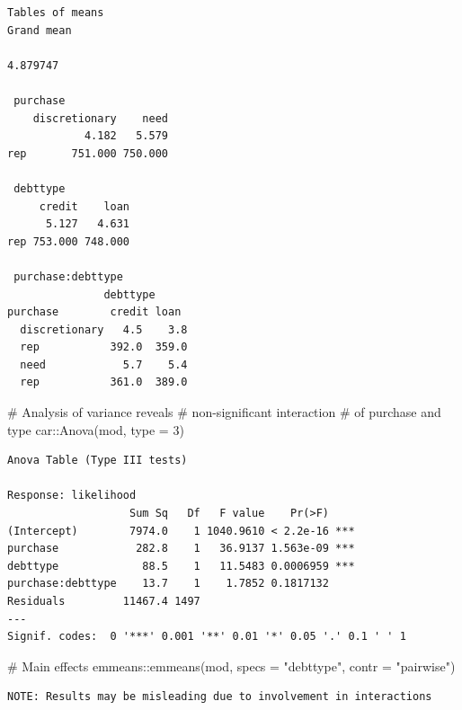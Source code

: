 \documentclass[
  11pt,
  letterpaper,
]{scrbook}
\newenvironment{Shaded}{\begin{snugshade}}{\end{snugshade}}
\newcommand{\AttributeTok}[1]{\textcolor[rgb]{0.40,0.45,0.13}{#1}}
\newcommand{\CommentTok}[1]{\textcolor[rgb]{0.37,0.37,0.37}{#1}}
\newcommand{\DecValTok}[1]{\textcolor[rgb]{0.68,0.00,0.00}{#1}}
\newcommand{\FunctionTok}[1]{\textcolor[rgb]{0.28,0.35,0.67}{#1}}
\newcommand{\NormalTok}[1]{\textcolor[rgb]{0.00,0.23,0.31}{#1}}
\newcommand{\SpecialCharTok}[1]{\textcolor[rgb]{0.37,0.37,0.37}{#1}}
\newcommand{\StringTok}[1]{\textcolor[rgb]{0.13,0.47,0.30}{#1}}
\theoremstyle{definition}
\theoremstyle{remark}
\begin{document}
\begin{verbatim}
Tables of means
Grand mean
         
4.879747 

 purchase 
    discretionary    need
            4.182   5.579
rep       751.000 750.000

 debttype 
     credit    loan
      5.127   4.631
rep 753.000 748.000

 purchase:debttype 
               debttype
purchase        credit loan 
  discretionary   4.5    3.8
  rep           392.0  359.0
  need            5.7    5.4
  rep           361.0  389.0
\end{verbatim}

\begin{Shaded}
\begin{Highlighting}[]
\CommentTok{\# Analysis of variance reveals }
\CommentTok{\# non{-}significant interaction}
\CommentTok{\# of purchase and type}
\NormalTok{car}\SpecialCharTok{::}\FunctionTok{Anova}\NormalTok{(mod, }\AttributeTok{type =} \DecValTok{3}\NormalTok{)}
\end{Highlighting}
\end{Shaded}

\begin{verbatim}
Anova Table (Type III tests)

Response: likelihood
                   Sum Sq   Df   F value    Pr(>F)    
(Intercept)        7974.0    1 1040.9610 < 2.2e-16 ***
purchase            282.8    1   36.9137 1.563e-09 ***
debttype             88.5    1   11.5483 0.0006959 ***
purchase:debttype    13.7    1    1.7852 0.1817132    
Residuals         11467.4 1497                        
---
Signif. codes:  0 '***' 0.001 '**' 0.01 '*' 0.05 '.' 0.1 ' ' 1
\end{verbatim}

\begin{Shaded}
\begin{Highlighting}[]
\CommentTok{\# Main effects}
\NormalTok{emmeans}\SpecialCharTok{::}\FunctionTok{emmeans}\NormalTok{(mod, }
                 \AttributeTok{specs =} \StringTok{"debttype"}\NormalTok{,}
                 \AttributeTok{contr =} \StringTok{"pairwise"}\NormalTok{)}
\end{Highlighting}
\end{Shaded}

\begin{verbatim}
NOTE: Results may be misleading due to involvement in interactions
\end{verbatim}
\end{document}
